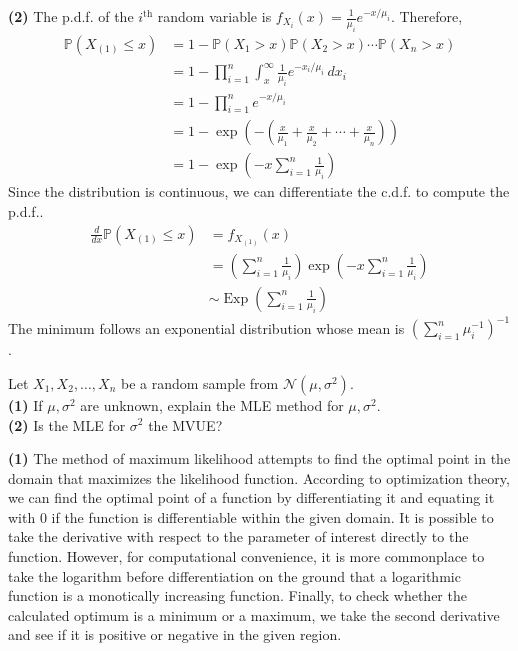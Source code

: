 \documentclass[answers]{exam}
\newcommand{\opn}{\operatorname}
\begin{document}
\begin{questions}
\begin{solution}
\end{solution}
\begin{solution}
   \textbf{(2)} The p.d.f. of the $i^{\text{th}}$ random variable is $f_{X_{i}}\left(x\right) = \frac{1}{\mu_{i}}e^{-x/\mu_{i}}$. Therefore,
   \begin{align*}
      \mathbb{P}\left(X_{\left(1\right)}\leq x\right) &= 1-\mathbb{P}\left(X_{1}>x\right)\mathbb{P}\left(X_{2}>x\right)\cdots \mathbb{P}\left(X_{n}>x\right)\\
      &= 1-\prod_{i=1}^{n}\int_{x}^{\infty}\frac{1}{\mu_{i}}e^{-x_{i}/\mu_{i}}\,dx_{i}\\
      &= 1-\prod_{i=1}^{n} e^{-x/\mu_{i}}\\
      &= 1-\exp\left(-\left(\frac{x}{\mu_{1}}+\frac{x}{\mu_{2}} + \cdots + \frac{x}{\mu_{n}} \right)\right)\\
      &= 1 - \exp\left(-x\sum_{i=1}^{n}\frac{1}{\mu_{i}}\right)
   \end{align*}
   Since the distribution is continuous, we can differentiate the c.d.f. to compute the p.d.f..
   \begin{align*}
      \frac{d}{dx}\mathbb{P}\left(X_{\left(1\right)}\leq x \right) &= f_{X_{\left(1\right)}}\left(x\right)\\
      &= \left(\sum_{i=1}^{n} \frac{1}{\mu_{i}}\right) \exp \left(-x\sum_{i=1}^{n}\frac{1}{\mu_{i}} \right)\\
      &\sim \opn{Exp}\left(\sum_{i=1}^{n}\frac{1}{\mu_{i}} \right)
   \end{align*}
   The minimum follows an exponential distribution whose mean is $\left(\sum_{i=1}^{n}\mu_{i}^{-1} \right)^{-1}$.
\end{solution}
   \question
   Let $X_{1}, X_{2}, \ldots , X_{n}$ be a random sample from $\mathcal{N}\left(\mu, \sigma^{2}\right)$.\\
   \textbf{(1)} If $\mu, \sigma^{2}$ are unknown, explain the MLE method for $\mu, \sigma^{2}$.\\
   \textbf{(2)} Is the MLE for $\sigma^{2}$ the MVUE?
   \begin{solution}
      \textbf{(1)} The method of maximum likelihood attempts to find the optimal point in the domain that maximizes the likelihood function. According to optimization theory, we can find the optimal point of a function by differentiating it and equating it with 0 if the function is differentiable within the given domain. It is possible to take the derivative with respect to the parameter of interest directly to the function. However, for computational convenience, it is more commonplace to take the logarithm before differentiation on the ground that a logarithmic function is a monotically increasing function. Finally, to check whether the calculated optimum is a minimum or a maximum, we take the second derivative and see if it is positive or negative in the given region.\par

\end{solution}
\end{questions}
\end{document}
